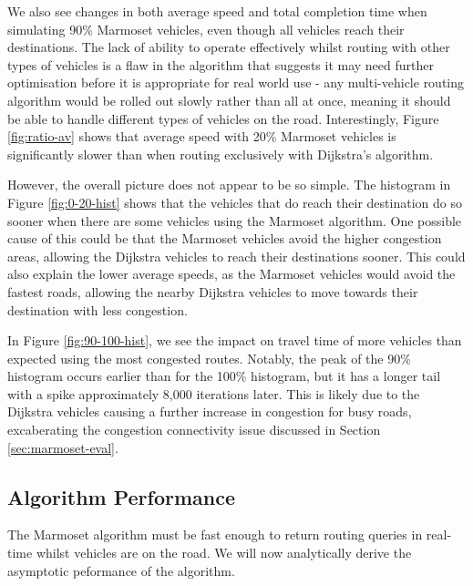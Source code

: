 \documentclass[ %
                    author={Alexander Hill},
                supervisor={Dr. Benjamin Sach},
                    degree={MEng},
                     title={MARMOSET},
                  subtitle={Multi-Agent Route Management using Online Simulation for Efficient Transportation},
                      type={research},
                      year={2016} ]{dissertation}
\begin{document}
We also see changes in both average speed and total completion time when
simulating 90\% Marmoset vehicles, even though all vehicles reach their
destinations. The lack of ability to operate effectively whilst routing with
other types of vehicles is a flaw in the algorithm that suggests it may need
further optimisation before it is appropriate for real world use - any
multi-vehicle routing algorithm would be rolled out slowly rather than all at
once, meaning it should be able to handle different types of vehicles on the
road. Interestingly, Figure \ref{fig:ratio-av} shows that average speed with
20\% Marmoset vehicles is significantly slower than when routing exclusively
with Dijkstra's algorithm.

However, the overall picture does not appear to be so simple. The histogram in
Figure \ref{fig:0-20-hist} shows that the vehicles that do reach their
destination do so sooner when there are some vehicles using the Marmoset
algorithm. One possible cause of this could be that the Marmoset vehicles avoid
the higher congestion areas, allowing the Dijkstra vehicles to reach their
destinations sooner. This could also explain the lower average speeds, as the
Marmoset vehicles would avoid the fastest roads, allowing the nearby Dijkstra
vehicles to move towards their destination with less congestion.

In Figure \ref{fig:90-100-hist}, we see the impact on travel time of more
vehicles than expected using the most congested routes. Notably, the peak of
the 90\% histogram occurs earlier than for the 100\% histogram, but it has a
longer tail with a spike approximately 8,000 iterations later.  This is likely
due to the Dijkstra vehicles causing a further increase in congestion for busy
roads, excaberating the congestion connectivity issue discussed in Section
\ref{sec:marmoset-eval}.

\subsection{Algorithm Performance}

The Marmoset algorithm must be fast enough to return routing queries in real-time
whilst vehicles are on the road. We will now analytically derive the asymptotic
peformance of the algorithm.
\end{document}
